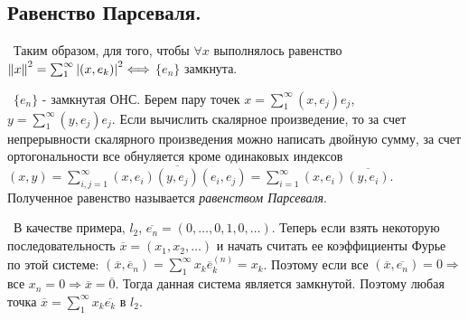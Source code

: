 \subsection*{Равенство Парсеваля.}

\noindent \textbullet~Таким образом, для того, чтобы $\forall x$ выполнялось равенство $\left\lVert x\right\rVert^2 = \sum_1^\infty \left\lvert(x, e_k)\right\rvert^2 \Longleftrightarrow$ $\{ e_n\}$
замкнута.

\smallskip
\noindent \textbullet~$\{ e_n \}$ - замкнутая ОНС. Берем пару точек $x = \sum_1^\infty (x, e_j) e_j$, $y = \sum_1^\infty (y, e_j) e_j$. Если вычислить скалярное 
произведение, то за счет непрерывности скалярного произведения можно написать двойную сумму, за счет ортогональности все обнуляется кроме одинаковых индексов
$(x, y) = \sum_{i, j = 1}^\infty (x, e_i) \overline{(y,e_j)} (e_i, e_j) = \sum_{i = 1}^\infty (x, e_i)\overline{(y, e_i)}$. Полученное равенство называется \textit{
равенством Парсеваля}.

\smallskip
\noindent \textbullet~В качестве примера, $l_2$, $\overline{e_n} = (0, \dots, 0, 1, 0, \dots)$. Теперь если взять некоторую последовательность $\overline{x} = (x_1, 
x_2, \dots)$ и начать считать ее коэффициенты Фурье по этой системе: $(\overline{x}, \overline{e}_n) = \sum_1^\infty x_k \overline{e}_k^{(n)} = x_k$. Поэтому если 
все $(\overline{x}, \overline{e_n}) = 0 \Rightarrow $ все $x_n = 0 \Rightarrow \overline{x} = \overline{0}$. Тогда данная система является замкнутой. Поэтому любая 
точка $\overline{x} = \sum_1^\infty x_k \overline{e_k}$ в $l_2$.